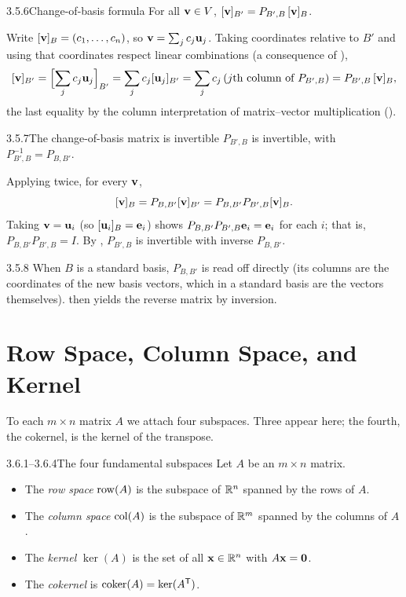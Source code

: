 \begin{thms}{3.5.6}{Change-of-basis formula}
For all $\mathbf{v}\in V$, \;$[\mathbf{v}]_{B'}=P_{B',B}\,[\mathbf{v}]_B$.
\end{thms}

\begin{prf}
Write $[\mathbf{v}]_B=(c_1,\dots,c_n)$, so $\mathbf{v}=\sum_j c_j\mathbf{u}_j$. Taking coordinates relative to $B'$ and using that coordinates respect linear combinations (a consequence of ),
\[
[\mathbf{v}]_{B'}=\Bigl[\sum_j c_j\mathbf{u}_j\Bigr]_{B'}=\sum_j c_j[\mathbf{u}_j]_{B'}=\sum_j c_j\,(\text{$j$th column of }P_{B',B})=P_{B',B}\,[\mathbf{v}]_B,
\]
the last equality by the column interpretation of matrix--vector multiplication ().
\end{prf}

\begin{thms}{3.5.7}{The change-of-basis matrix is invertible}
$P_{B',B}$ is invertible, with $P_{B',B}^{-1}=P_{B,B'}$.
\end{thms}

\begin{prf}
Applying  twice, for every $\mathbf{v}$,
\[
[\mathbf{v}]_B=P_{B,B'}[\mathbf{v}]_{B'}=P_{B,B'}P_{B',B}[\mathbf{v}]_B.
\]
Taking $\mathbf{v}=\mathbf{u}_i$ (so $[\mathbf{u}_i]_B=\mathbf{e}_i$) shows $P_{B,B'}P_{B',B}\mathbf{e}_i=\mathbf{e}_i$ for each $i$; that is, $P_{B,B'}P_{B',B}=I$. By , $P_{B',B}$ is invertible with inverse $P_{B,B'}$.
\end{prf}

\begin{rmks}{3.5.8}
When $B$ is a standard basis, $P_{B,B'}$ is read off directly (its columns are the coordinates of the new basis vectors, which in a standard basis are the vectors themselves).  then yields the reverse matrix by inversion.
\end{rmks}

\section{Row Space, Column Space, and Kernel}
\label{sec:3.6}

To each $m\times n$ matrix $A$ we attach four subspaces. Three appear here; the fourth, the cokernel, is the kernel of the transpose.

\begin{defns}{3.6.1--3.6.4}{The four fundamental subspaces}
Let $A$ be an $m\times n$ matrix.
\begin{itemize}[leftmargin=1.4em,itemsep=1pt]
\item The \emph{row space} $\operatorname{row}(A)$ is the subspace of $\mathbb{R}^n$ spanned by the rows of $A$.
\item The \emph{column space} $\operatorname{col}(A)$ is the subspace of $\mathbb{R}^m$ spanned by the columns of $A$.
\item The \emph{kernel} $\ker(A)$ is the set of all $\mathbf{x}\in\mathbb{R}^n$ with $A\mathbf{x}=\mathbf{0}$.
\item The \emph{cokernel} is $\operatorname{coker}(A)=\ker(A^{\mathsf{T}})$.
\end{itemize}
\end{defns}

